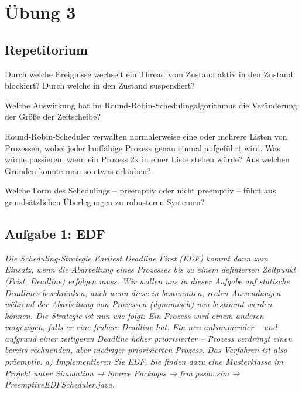 \documentclass[a4paper]{article}
\begin{document}
\newpage
\section{Übung 3}
\subsection{Repetitorium}
\begin{description*}
    \item[Durch welche Ereignisse wechselt ein Thread vom Zustand aktiv in den Zustand blockiert? Durch welche in den Zustand suspendiert?]
    \item[Welche Auswirkung hat im Round-Robin-Schedulingalgorithmus die Veränderung der Größe der Zeitscheibe?]
    \item[Round-Robin-Scheduler verwalten normalerweise eine oder mehrere Listen von Prozessen, wobei jeder lauffähige Prozess genau einmal aufgeführt wird. Was würde passieren, wenn ein Prozess 2x in einer Liste stehen würde? Aus welchen Gründen könnte man so etwas erlauben?]
    \item[Welche Form des Schedulings – preemptiv oder nicht preemptiv – führt aus grundsätzlichen Überlegungen zu robusteren Systemen?]
\end{description*}
\subsection{Aufgabe 1: EDF}
\textit{Die Scheduling-Strategie Earliest Deadline First (EDF) kommt dann zum Einsatz, wenn die Abarbeitung eines Prozesses bis zu einem definierten Zeitpunkt (Frist, Deadline) erfolgen muss. Wir wollen uns in dieser Aufgabe auf statische Deadlines beschränken, auch wenn diese in bestimmten, realen Anwendungen während der Abarbeitung von Prozessen (dynamisch) neu bestimmt werden können.
    Die Strategie ist nun wie folgt: Ein Prozess wird einem anderen vorgezogen, falls er eine frühere Deadline hat. Ein neu ankommender – und aufgrund einer zeitigeren Deadline höher priorisierter – Prozess verdrängt einen bereits rechnenden, aber niedriger priorisierten Prozess. Das Verfahren ist also präemptiv.}
\vspace{10mm}
\textit{a) Implementieren Sie EDF. Sie finden dazu eine Musterklasse im Projekt unter Simulation → Source Packages → frm.pssav.sim → PreemptiveEDFScheduler.java.}
\vspace{10mm}
\end{document}
